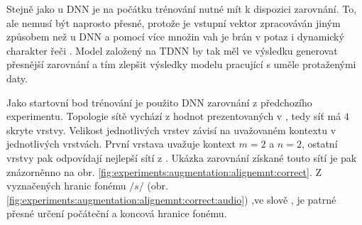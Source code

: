 Stejně jako u DNN je na počátku trénování nutné mít k dispozici zarovnání. To, ale nemusí být naprosto přesné, protože je vstupní vektor zpracováván jiným způsobem než u DNN a pomocí více množin vah je brán v potaz i dynamický charakter řeči \cite{Peddinti2015}. Model založený na TDNN by tak měl ve výsledku generovat přesnější zarovnání a tím zlepšit výsledky modelu pracující s uměle protaženými daty.

Jako startovní bod trénování je použito DNN zarovnání z předchozího experimentu. Topologie sítě vychází z hodnot prezentovaných v \cite{Peddinti2015}, tedy síť má $4$ skryte vrstvy. Velikost jednotlivých vrstev závisí na uvažovaném kontextu v jednotlivých vrstvách. První vrstava uvažuje kontext $m=2$ a $n=2$, ostatní vrstvy pak odpovídají nejlepší sítí z \cite{Peddinti2015}. Ukázka zarovnání získané touto sítí je pak znázorněnno na obr. \ref{fig:experiments:augmentation:alignemnt:correct}. Z vyznačených hranic fonému $/s/$ (obr. \ref{fig:experiments:augmentation:alignemnt:correct:audio}) ,ve slově , je patrné přesné určení počáteční a koncová hranice fonému.

